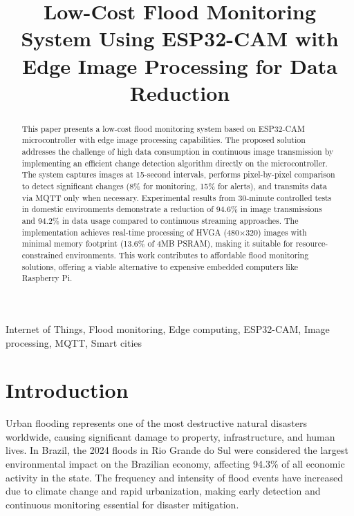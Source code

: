 \documentclass[conference]{IEEEtran}
\begin{document}
\title{Low-Cost Flood Monitoring System Using ESP32-CAM with Edge Image Processing for Data Reduction}

\author{
\and
{}
}

\maketitle

\begin{abstract}
This paper presents a low-cost flood monitoring system based on ESP32-CAM microcontroller with edge image processing capabilities. The proposed solution addresses the challenge of high data consumption in continuous image transmission by implementing an efficient change detection algorithm directly on the microcontroller. The system captures images at 15-second intervals, performs pixel-by-pixel comparison to detect significant changes (8\% for monitoring, 15\% for alerts), and transmits data via MQTT only when necessary. Experimental results from 30-minute controlled tests in domestic environments demonstrate a reduction of 94.6\% in image transmissions and 94.2\% in data usage compared to continuous streaming approaches. The implementation achieves real-time processing of HVGA (480×320) images with minimal memory footprint (13.6\% of 4MB PSRAM), making it suitable for resource-constrained environments. This work contributes to affordable flood monitoring solutions, offering a viable alternative to expensive embedded computers like Raspberry Pi.
\end{abstract}

\begin{IEEEkeywords}
Internet of Things, Flood monitoring, Edge computing, ESP32-CAM, Image processing, MQTT, Smart cities
\end{IEEEkeywords}

\section{Introduction}
Urban flooding represents one of the most destructive natural disasters worldwide, causing significant damage to property, infrastructure, and human lives. In Brazil, the 2024 floods in Rio Grande do Sul were considered the largest environmental impact on the Brazilian economy, affecting 94.3\% of all economic activity in the state. The frequency and intensity of flood events have increased due to climate change and rapid urbanization, making early detection and continuous monitoring essential for disaster mitigation.
\end{document}
